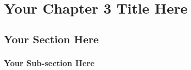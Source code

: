 \label{05.labreport3}
\chapter{Your Chapter 3 Title Here}
\section{Your Section Here}
\subsection{Your Sub-section Here}